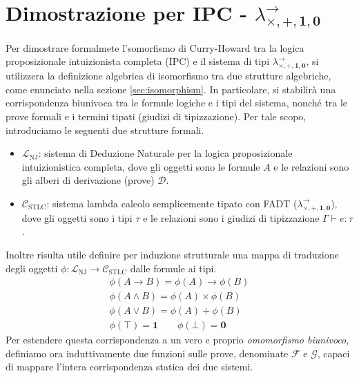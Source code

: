\section{Dimostrazione per IPC - \texorpdfstring{$\lambda^{\to}_{\times, +, \mathbf{1}, \mathbf{0}}$}{Lambda-Calculus with FADT}}
Per dimostrare formalmete l'somorfismo di Curry-Howard tra la logica proposizionale intuizionista completa (IPC) e il sistema di tipi $\lambda^{\to}_{\times, +, \mathbf{1}, \mathbf{0}}$, si utilizzera 
la definizione algebrica di isomorfismo tra due strutture algebriche, come enunciato nella sezione \ref{sec:isomorphism}. In particolare, si stabilirà una corrispondenza biunivoca tra le formule logiche 
e i tipi del sistema, nonché tra le prove formali e i termini tipati (giudizi di tipizzazione). Per tale scopo, introduciamo le seguenti due strutture formali.
\begin{itemize}
    \item $\mathcal{L}_{\text{NJ}}$:
        sistema di Deduzione Naturale per la logica proposizionale intuizionistica completa, dove gli oggetti sono le formule $A$ e le relazioni sono gli alberi di derivazione (prove) $\mathcal{D}$.
    \item $\mathcal{C}_{\text{STLC}}$: 
        sistema lambda calcolo semplicemente tipato con FADT ($\lambda^{\to}_{\times, +, \mathbf{1}, \mathbf{0}}$), dove gli oggetti sono i tipi $\tau$ e le relazioni sono i giudizi di tipizzazione 
        $\Gamma \vdash e : \tau$.
\end{itemize}
Inoltre risulta utile definire per induzione strutturale una mappa di traduzione degli oggetti $\phi: \mathcal{L}_{\text{NJ}} \to \mathcal{C}_{\text{STLC}}$ dalle formule ai tipi.
\begin{gather*}
    \phi(A \to B) = \phi(A) \to \phi(B)      \\
    \phi(A \land B) = \phi(A) \times \phi(B) \\
    \phi(A \lor B) = \phi(A) + \phi(B)       \\
    \phi(\top) = \mathbf{1} \qquad \phi(\bot) = \mathbf{0}
\end{gather*}
Per estendere questa corrispondenza a un vero e proprio \emph{omomorfismo biunivoco}, definiamo ora induttivamente due funzioni sulle prove, denominate $\mathcal{F}$ e $\mathcal{G}$, 
capaci di mappare l'intera corrispondenza statica dei due sistemi.

